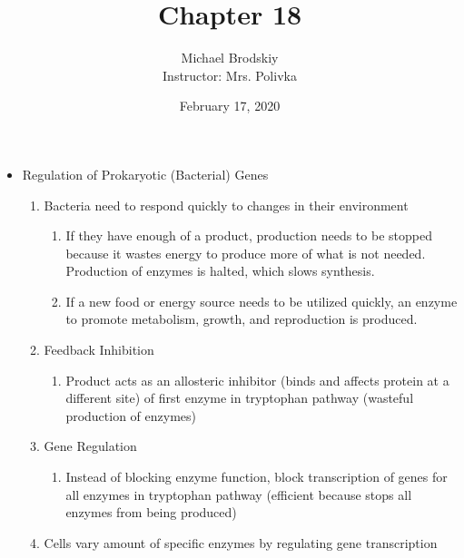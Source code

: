 \documentclass[12pt]{article}
\title{Chapter 18}
\date{February 17, 2020}
\author{Michael Brodskiy\\ \small Instructor: Mrs. Polivka}
\begin{document}
\maketitle

\begin{itemize}

  \item Regulation of Prokaryotic (Bacterial) Genes

    \begin{enumerate}

      \item Bacteria need to respond quickly to changes in their environment

        \begin{enumerate}

          \item If they have enough of a product, production needs to be stopped because it wastes energy to produce more of what is not needed. Production of enzymes is halted, which slows synthesis.

          \item If a new food or energy source needs to be utilized quickly, an enzyme to promote metabolism, growth, and reproduction is produced.

        \end{enumerate}

      \item Feedback Inhibition

        \begin{enumerate}

          \item Product acts as an allosteric inhibitor (binds and affects protein at a different site) of first enzyme in tryptophan pathway (wasteful production of enzymes)

        \end{enumerate}

      \item Gene Regulation

        \begin{enumerate}

          \item Instead of blocking enzyme function, block transcription of genes for all enzymes in tryptophan pathway (efficient because stops all enzymes from being produced)

        \end{enumerate}

      \item Cells vary amount of specific enzymes by regulating gene transcription


\end{enumerate}
\end{itemize}
\end{document}
